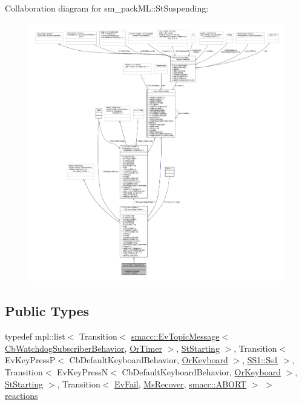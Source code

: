 Collaboration diagram for sm\+\_\+pack\+ML\+:\+:St\+Suspending\+:
\nopagebreak
\begin{figure}[H]
\begin{center}
\leavevmode
\includegraphics[width=350pt]{structsm__packML_1_1StSuspending__coll__graph}
\end{center}
\end{figure}
\subsection*{Public Types}
\begin{DoxyCompactItemize}
\item 
typedef mpl\+::list$<$ Transition$<$ \hyperlink{structsmacc_1_1default__events_1_1EvTopicMessage}{smacc\+::\+Ev\+Topic\+Message}$<$ \hyperlink{classsm__packML_1_1cl__subscriber_1_1CbWatchdogSubscriberBehavior}{Cb\+Watchdog\+Subscriber\+Behavior}, \hyperlink{classsm__packML_1_1OrTimer}{Or\+Timer} $>$, \hyperlink{structsm__packML_1_1StStarting}{St\+Starting} $>$, Transition$<$ Ev\+Key\+PressP$<$ Cb\+Default\+Keyboard\+Behavior, \hyperlink{classsm__packML_1_1OrKeyboard}{Or\+Keyboard} $>$, \hyperlink{structsm__packML_1_1SS1_1_1Ss1}{S\+S1\+::\+Ss1} $>$, Transition$<$ Ev\+Key\+PressN$<$ Cb\+Default\+Keyboard\+Behavior, \hyperlink{classsm__packML_1_1OrKeyboard}{Or\+Keyboard} $>$, \hyperlink{structsm__packML_1_1StStarting}{St\+Starting} $>$, Transition$<$ \hyperlink{structsm__packML_1_1EvFail}{Ev\+Fail}, \hyperlink{classsm__packML_1_1MsRecover}{Ms\+Recover}, \hyperlink{structsmacc_1_1default__transition__tags_1_1ABORT}{smacc\+::\+A\+B\+O\+RT} $>$ $>$ \hyperlink{structsm__packML_1_1StSuspending_a4420f6035a11f26b50834a4fa8bee7b7}{reactions}
\end{DoxyCompactItemize}
